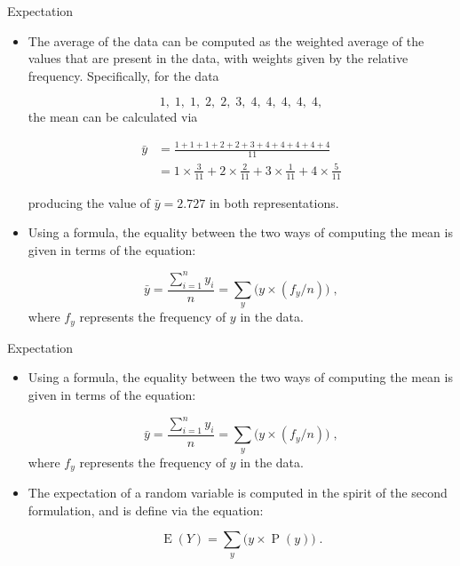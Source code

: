 \documentclass[10pt]{beamer}\usepackage[]{graphicx}\usepackage[]{color}
\newcommand{\Expec}{\operatorname{E}}
\newcommand{\Prob}{\operatorname{P}}
\begin{document}
\begin{frame}[fragile]{Expectation}
	\small
	\begin{itemize}
		
		\item The average of the data can be computed as the weighted average of the values that are present
		in the data, with weights given by the relative frequency. Specifically,
		for the data
		
		$$1,\; 1,\; 1,\; 2,\; 2,\; 3,\; 4,\; 4,\; 4,\; 4,\; 4,$$ the mean can be calculated via
		
		\begin{align*}
			\bar{y} &= \frac{1 + 1 + 1 + 2 + 2 + 3 + 4 + 4 + 4 + 4 + 4}{11}\\
			& =	1\times \frac{3}{11} + 2 \times \frac{2}{11} + 3 \times \frac{1}{11} + 4 \times \frac{5}{11}
		\end{align*}
		
		producing the value of $\bar y =2.727$ in both representations. 
		
		\item Using a formula, the equality between the two ways of computing the mean is
		given in terms of the equation:
		
		$$\bar y = \frac{\sum_{i=1}^n y_i}{n} = \sum_y \big(y \times (f_y/n)\big)\;,$$
		where $f_y$ represents the frequency of $y$ in the data. 
		
		
		
		
	\end{itemize}
	
\end{frame}


\begin{frame}[fragile]{Expectation}
	\small
	\begin{itemize}		
		
		\item Using a formula, the equality between the two ways of computing the mean is
		given in terms of the equation:
		
		$$\bar y = \frac{\sum_{i=1}^n y_i}{n} = \sum_y \big(y \times (f_y/n)\big)\;,$$
		where $f_y$ represents the frequency of $y$ in the data. 
		
		\item The expectation of a random variable is computed in the spirit of the
		second formulation, and is define via the equation:
		
		$$\Expec(Y) = \sum_y \big(y \times \Prob(y)\big)\;.$$
		
		
	\end{itemize}
	
\end{frame}
\end{document}
